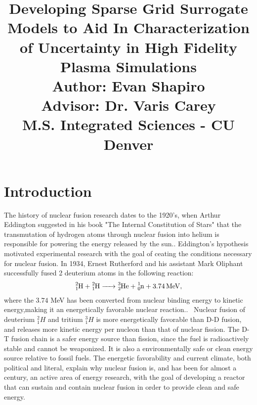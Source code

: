 \documentclass{article}
\title{ Developing Sparse Grid Surrogate Models to Aid In Characterization of Uncertainty in High Fidelity Plasma Simulations\\ Author: Evan Shapiro\\ Advisor: Dr. Varis Carey\\ M.S. Integrated Sciences - CU Denver}
\begin{document}
\maketitle
\noindent
\section{Introduction}
The history of nuclear fusion research dates to the 1920's, when Arthur Eddington suggested in his book "The Internal Constitution of Stars" that the transmutation of hydrogen atoms through nuclear fusion into helium is responsible for powering the energy released by the sun.\cite{a.s._eddington_internal_1926}. Eddington's hypothesis motivated experimental research with the goal of ceating the conditions necessary for nuclear fusion.
In 1934, Ernest Rutherford and his assistant Mark Oliphant successfully fused 2 deuterium atoms in the following reaction:
\begin{align*}
\ce{^2_1H + ^2_1H ->	^3_2He + ^1_0n + 3.74 MeV}, 
\end{align*}
where the $3.74$ MeV has been converted from nuclear binding energy to kinetic energy,making it an energetically favorable nuclear reaction.\cite{m._l._e._oliphant_transmutation_nodate}. \
Nuclear fusion of deuterium $^2_1H$  and tritium $^3_1H$ is more energetically favorable than D-D fusion, and releases more kinetic energy per nucleon than that of nuclear fission. The D-T fusion chain is a safer energy source than fission, since the fuel is radioactively stable and cannot be weaponized. It is also a environmentally safe or clean energy source relative to fossil fuels. The energetic favorability and current climate, both political and literal, explain why nuclear fusion is, and has been for almost a century, an active area of energy research, with the goal of developing a reactor that can sustain and contain nuclear fusion in order to provide clean and safe energy.\\

\vspace{0.01cm}
\end{document}

